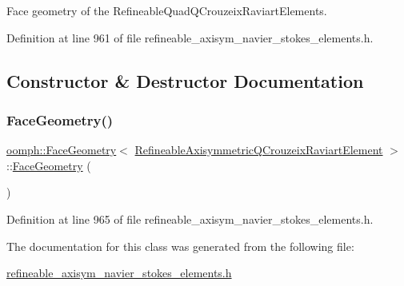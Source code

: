 Face geometry of the Refineable\+Quad\+Q\+Crouzeix\+Raviart\+Elements. 

Definition at line 961 of file refineable\+\_\+axisym\+\_\+navier\+\_\+stokes\+\_\+elements.\+h.



\subsection{Constructor \& Destructor Documentation}
\mbox{\label{classoomph_1_1FaceGeometry_3_01RefineableAxisymmetricQCrouzeixRaviartElement_01_4_ac070e211c529533c6b97a67fbdedf49f}} 
\subsubsection{\texorpdfstring{Face\+Geometry()}{FaceGeometry()}}
{\footnotesize\ttfamily \hyperlink{classoomph_1_1FaceGeometry}{oomph\+::\+Face\+Geometry}$<$ \hyperlink{classoomph_1_1RefineableAxisymmetricQCrouzeixRaviartElement}{Refineable\+Axisymmetric\+Q\+Crouzeix\+Raviart\+Element} $>$\+::\hyperlink{classoomph_1_1FaceGeometry}{Face\+Geometry} (\begin{DoxyParamCaption}{ }\end{DoxyParamCaption})\hspace{0.3cm}{\ttfamily [inline]}}



Definition at line 965 of file refineable\+\_\+axisym\+\_\+navier\+\_\+stokes\+\_\+elements.\+h.



The documentation for this class was generated from the following file\+:\begin{DoxyCompactItemize}
\item 
\hyperlink{refineable__axisym__navier__stokes__elements_8h}{refineable\+\_\+axisym\+\_\+navier\+\_\+stokes\+\_\+elements.\+h}\end{DoxyCompactItemize}
